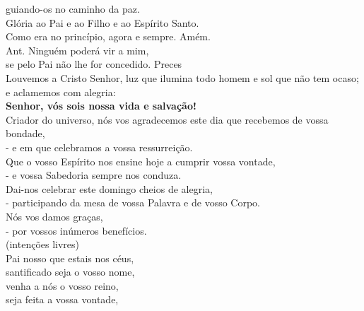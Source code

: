 \documentclass[opennany]{book}
\begin{document}
\begin{center}
    guiando-os no caminho da paz.
    \vspace{.2cm} \\
    \textsuperscript{\underline{\hspace{.06in}}} Glória ao Pai e ao Filho e ao Espírito Santo.\ \textsuperscript{\gresixstar{}} \\
    Como era no princípio, agora e sempre. Amém.
    \vspace{.2cm} \\
    \textcolor{VioletRed2}{Ant.} Ninguém poderá vir a mim, \\
    se pelo Pai não lhe for concedido.
    \newpage
    \textcolor{VioletRed2}{Preces}
    \vspace{.2cm} \\
    Louvemos a Cristo Senhor, luz que ilumina todo homem e sol que não tem ocaso; e aclamemos com alegria:
    \vspace{.2cm} \\
    \RbarRed{} \textbf{Senhor, vós sois nossa vida e salvação!}
    \vspace{.2cm} \\
    Criador do universo, nós vos agradecemos este dia que recebemos de vossa bondade, \\
    -  e em que celebramos a vossa ressurreição. \RbarRed{}
    \vspace{.2cm} \\
    Que o vosso Espírito nos ensine hoje a cumprir vossa vontade, \\
    -  e vossa Sabedoria sempre nos conduza. \RbarRed{}
    \vspace{.2cm} \\
    Dai-nos celebrar este domingo cheios de alegria, \\
    - participando da mesa de vossa Palavra e de vosso Corpo. \RbarRed{}
    \vspace{.2cm} \\
    Nós vos damos graças, \\
    - por vossos inúmeros benefícios. \RbarRed{}
    \vspace{.2cm} \\
    \textcolor{VioletRed2}{\small (intenções livres)}
    \vspace{.2cm} \\
    Pai nosso que estais nos céus, \\
    santificado seja o vosso nome, \\
    venha a nós o vosso reino, \\
    seja feita a vossa vontade, \\

\end{center}
\end{document}
